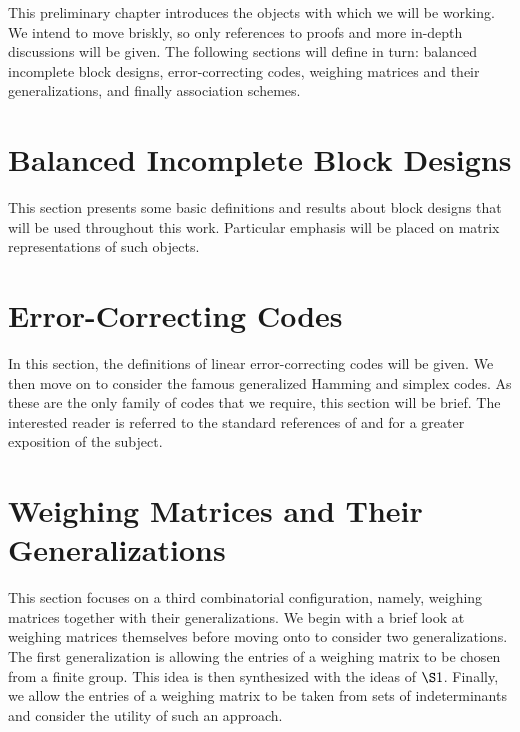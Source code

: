 \documentclass[../../main]{subfiles}
\begin{document}
This preliminary chapter introduces the objects with which we will be working.
We intend to move briskly, so only references to proofs and more in-depth
discussions 
will be given. The
following sections will define in turn: balanced incomplete block 
designs, error-correcting codes, weighing matrices and their generalizations,
and finally association schemes.

\section{\centering Balanced Incomplete Block Designs}

This section presents some basic definitions and results about block designs
that will be used throughout this work. Particular emphasis will be placed on
matrix representations of such objects. 

\dinkus



\section{\centering Error-Correcting Codes}

In this section, the definitions of linear error-correcting codes will be given.
We then move on to consider the famous generalized Hamming and simplex codes. As
these are the only family of codes that we require, this section will be brief.
The interested reader is referred to the standard references of \cite{pless-book}
and \cite{error-correcting-codes-v1} for a greater exposition of the subject. 

\dinkus



\section{\centering Weighing Matrices and Their Generalizations}

This section focuses on a third combinatorial configuration, namely, weighing
matrices together with their generalizations. We begin with a brief look at weighing matrices themselves before moving onto to consider two generalizations. The first generalization is allowing the entries of a weighing matrix to be chosen from a finite group. This idea is then synthesized with the ideas of $\S1$. Finally, we allow the entries of a weighing matrix to be taken from sets of indeterminants and consider the utility of such an approach.
\end{document}
